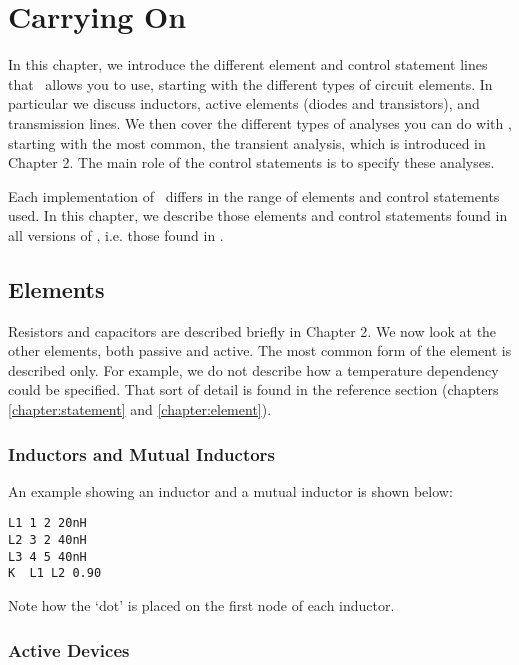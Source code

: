\chapter{Carrying On\label{chapter:chap3}}

In this chapter, we introduce the different element and control
statement lines that \spice\ allows you to use, starting with the different
types of circuit elements. In particular we discuss inductors,
active elements (diodes and transistors), and transmission lines.
We then cover the different types of analyses you can do with \spice,
starting with the most common, the transient analysis, which is
introduced in Chapter 2.   The main role of the control statements
is to specify these analyses.

{
Each implementation of \spice\ differs in the range of elements and control
statements used.  In this chapter, we describe those elements and
control statements found in all versions of \spice, i.e. those found
in \spicetwo.}

\section{Elements}

Resistors and capacitors are described briefly in Chapter 2.
We now look at the other elements, both passive and active.
The most common form of the element is described only.
For example, we do not
describe how a temperature dependency could be specified.  That
sort of detail is found in the reference section
(chapters \ref{chapter:statement} and \ref{chapter:element}).

\subsection{Inductors and Mutual Inductors}

An example showing an inductor and a mutual inductor is shown
below:
\par\noindent
\centerline{}
\par\noindent
\begin{center}
{\tt\begin{verbatim}
L1 1 2 20nH
L2 3 2 40nH
L3 4 5 40nH
K  L1 L2 0.90
\end{verbatim} }
\end{center}
\par\noindent
Note how the `dot' is placed on the first node of each inductor.

\subsection{Active Devices}


